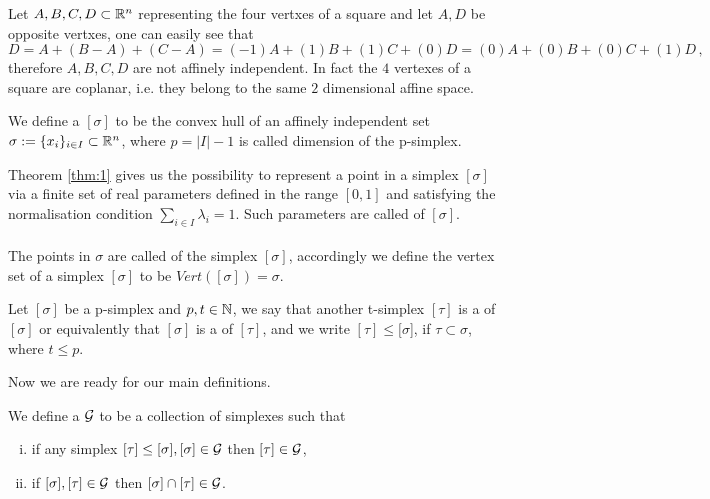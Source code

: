 \documentclass[../1.tex]{subfiles}
\begin{document}
    \begin{exa}
        Let ${A,B,C,D} \subset \mathbb{R}^n$ representing the four vertxes of a square and let $A,D$ be opposite vertxes, one can easily see that 
        \[ D = A + (B-A) + (C-A) = (-1)A + (1)B + (1)C + (0)D = (0)A + (0)B + (0)C + (1)D \, ,\]
        therefore $A,B,C,D$ are not affinely independent.
        In fact the $4$ vertexes of a square are coplanar, i.e. they belong to the same $2$ dimensional affine space.
    \end{exa}


    \begin{defn}
        We define a  $[\sigma]$ to be the convex hull of an affinely independent set $\sigma := \{x_i\}_{i \in I} \subset \mathbb{R}^n$,
        where $p = |I|-1$ is called dimension of the p-simplex. 
    \end{defn}

    Theorem \ref{thm:1} gives us the possibility to represent a point in a simplex $[\sigma]$ via a finite set of real parameters defined in the range $[0,1]$
    and satisfying the normalisation condition $\sum_{i \in I } \lambda_i = 1$. Such parameters are called  of $[\sigma]$.\\
    \hfill \\
    The points in $\sigma$ are called  of the simplex $[\sigma]$, accordingly we define the vertex set of a simplex $[\sigma]$ to be 
    $Vert([\sigma]) = \sigma$.
    
    \begin{defn}
        Let $[\sigma]$ be a p-simplex and $p,t \in \mathbb{N}$, we say that another t-simplex $[\tau]$ is a  of $[\sigma]$ or equivalently 
        that $[\sigma]$ is a  of $[\tau]$, and we write $[\tau] \leq [\sigma$], if $\tau \subset \sigma$, where $t \leq p$.
    \end{defn}

    Now we are ready for our main definitions.
    
    \begin{defn}
        We define a  $\mathcal{G}$ to be a collection of simplexes such that
        \begin{enumerate}[(i)]
            \item if any simplex $ [\tau] \leq [\sigma], [\sigma] \in \mathcal{G}$ then $ [\tau] \in \mathcal{G}$,
            \item if $ [\sigma], [\tau] \in \mathcal{G}$ then $[\sigma] \cap [\tau] \in \mathcal{G}$.
        \end{enumerate}
    \end{defn}
\end{document}
